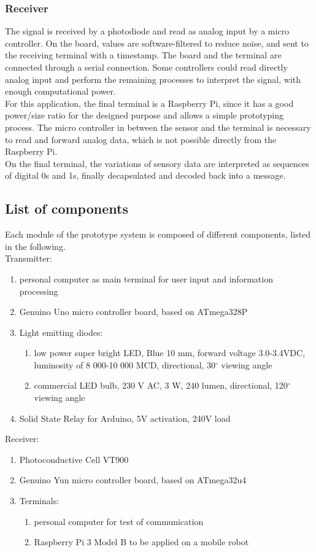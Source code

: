 \subsubsection{Receiver}
The signal is received by a photodiode and read as analog input by a micro controller.
On the board, values are software-filtered to reduce noise, and sent to the receiving terminal with a timestamp.
The board and the terminal are connected through a serial connection.
Some controllers could read directly analog input and perform the remaining processes to interpret the signal, with enough computational power.\\ 
For this application, the final terminal is a Raspberry Pi, since it has a good power/size ratio for the designed purpose and allows a simple prototyping process. The micro controller in between the sensor and the terminal is necessary to read and forward analog data, which is not possible directly from the Raspberry Pi.\\
On the final terminal, the variations of sensory data are interpreted as sequences of digital 0s and 1s, finally decapsulated and decoded back into a message.

\subsection{List of components}
\label{components}
Each module of the prototype system is composed of different components, listed in the following.\\
Transmitter:
\begin{enumerate}
\item personal computer as main terminal for user input and information processing
\item Genuino Uno micro controller board, based on ATmega328P \cite{genuinouno}
\item Light emitting diodes:
\begin{enumerate}
\item low power super bright LED, Blue 10 mm, forward voltage 3.0-3.4VDC, luminosity of 8 000-10 000 MCD, directional, 30$^{\circ}$ viewing angle \cite{ledDS}
\item commercial LED bulb, 230 V AC, 3 W, 240 lumen, directional, 120$^{\circ}$ viewing angle 
\end{enumerate}
\item Solid State Relay for Arduino, 5V activation, 240V load
\end{enumerate}
Receiver:
\begin{enumerate}
\item Photoconductive Cell VT900
\item Genuino Yun micro controller board, based on ATmega32u4 \cite{arduinoyun}
\item Terminals:
\begin{enumerate}
\item personal computer for test of communication
\item Raspberry Pi 3 Model B to be applied on a mobile robot \cite{raspberrypi}
\end{enumerate}
\end{enumerate}

